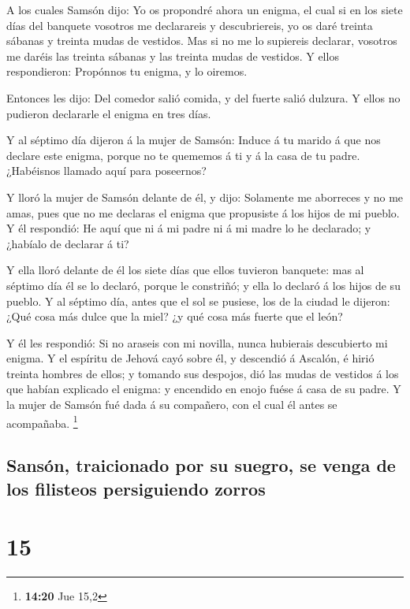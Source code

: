  A los cuales Samsón dijo: Yo os propondré ahora un
enigma, el cual si en los siete días del banquete vosotros me
declarareis y descubriereis, yo os daré treinta sábanas y treinta mudas
de vestidos.  Mas si no me lo supiereis declarar,
vosotros me daréis las treinta sábanas y las treinta mudas de vestidos.
Y ellos respondieron: Propónnos tu enigma, y lo oiremos.

 Entonces les dijo: Del comedor salió comida, y del
fuerte salió dulzura. Y ellos no pudieron declararle el enigma en tres
días.

 Y al séptimo día dijeron á la mujer de Samsón: Induce á
tu marido á que nos declare este enigma, porque no te quememos á ti y á
la casa de tu padre. ¿Habéisnos llamado aquí para poseernos?

 Y lloró la mujer de Samsón delante de él, y dijo:
Solamente me aborreces y no me amas, pues que no me declaras el enigma
que propusiste á los hijos de mi pueblo. Y él respondió: He aquí que ni
á mi padre ni á mi madre lo he declarado; y ¿habíalo de declarar á ti?

 Y ella lloró delante de él los siete días que ellos
tuvieron banquete: mas al séptimo día él se lo declaró, porque le
constriñó; y ella lo declaró á los hijos de su pueblo.  Y
al séptimo día, antes que el sol se pusiese, los de la ciudad le
dijeron: ¿Qué cosa más dulce que la miel? ¿y qué cosa más fuerte que el
león?

 Y él les respondió: Si no araseis con mi novilla, nunca
hubierais descubierto mi enigma.  Y el espíritu de Jehová
cayó sobre él, y descendió á Ascalón, é hirió treinta hombres de ellos;
y tomando sus despojos, dió las mudas de vestidos á los que habían
explicado el enigma: y encendido en enojo fuése á casa de su padre. Y la
mujer de Samsón fué dada á su compañero, con el cual él antes se
acompañaba. \footnote{\textbf{14:20} Jue 15,2}

\hypertarget{sansuxf3n-traicionado-por-su-suegro-se-venga-de-los-filisteos-persiguiendo-zorros}{%
\subsection{Sansón, traicionado por su suegro, se venga de los filisteos
persiguiendo
zorros}\label{sansuxf3n-traicionado-por-su-suegro-se-venga-de-los-filisteos-persiguiendo-zorros}}

\hypertarget{section-14}{%
\section{15}\label{section-14}}

